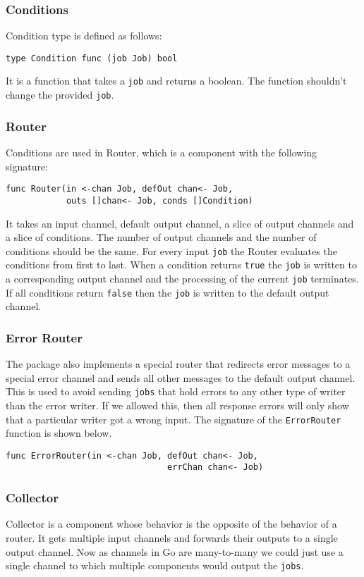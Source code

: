 \subsubsection{Conditions}
Condition type is defined as follows:
\begin{lstlisting}
type Condition func (job Job) bool
\end{lstlisting}
It is a function that takes a \texttt{job} and returns a boolean.
The function shouldn't change the provided \texttt{job}.

\subsubsection{Router}
Conditions are used in Router, which is a component with the 
following signature:
\begin{lstlisting}
func Router(in <-chan Job, defOut chan<- Job, 
            outs []chan<- Job, conds []Condition)
\end{lstlisting}
It takes an input channel, default output channel, a slice of output channels 
and a slice of conditions.
The number of output channels and the number of conditions should be the same.
For every input \texttt{job} the Router evaluates the conditions from first to last.
When a condition returns \texttt{true} the \texttt{job} is written to a 
corresponding output channel 
and the processing of the current \texttt{job} terminates. If all conditions 
return \texttt{false} then the \texttt{job} is written to the default output channel.

\subsubsection{Error Router}
The package also implements a special router that redirects error messages
to a special error channel and sends all other messages to the default output 
channel. This is used to avoid sending \texttt{jobs} that hold errors to 
any other type of writer than the error writer. If we allowed this, then
all response errors will only show that a particular writer got a wrong input.
The signature of the \texttt{ErrorRouter} function is shown below.
\begin{lstlisting}
func ErrorRouter(in <-chan Job, defOut chan<- Job, 
                                errChan chan<- Job)
\end{lstlisting}

\subsubsection{Collector}
Collector is a component whose behavior is the opposite of the behavior 
of a router. It gets multiple input channels
and forwards their outputs to a single output channel. Now as channels
in Go are many-to-many we could just use a single channel to which
multiple components would output the \texttt{jobs}. 

